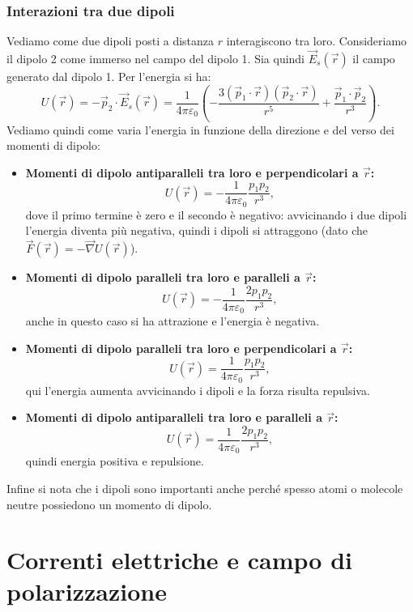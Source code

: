 \documentclass{book}
\begin{document}
\subsection{Interazioni tra due dipoli}
Vediamo come due dipoli posti a distanza $r$ interagiscono tra loro. Consideriamo il dipolo 2 come immerso nel campo del dipolo 1. Sia quindi $\vec{E}_s(\vec{r})$ il campo generato dal dipolo 1. Per l'energia si ha:
\[
U(\vec{r})= - \vec{p}_2\cdot\vec{E}_s(\vec{r})
= \frac{1}{4\pi\varepsilon_0}\!\left(-\frac{3(\vec{p}_1\cdot\vec{r})(\vec{p}_2\cdot\vec{r})}{r^5}+\frac{\vec{p}_1\cdot\vec{p}_2}{r^3}\right).
\]
Vediamo quindi come varia l'energia in funzione della direzione e del verso dei momenti di dipolo:
\begin{itemize}
    \item \textbf{Momenti di dipolo antiparalleli tra loro e perpendicolari a $\vec{r}$:}\\
    \[
    U(\vec{r}) = -\frac{1}{4\pi\varepsilon_0}\frac{p_1p_2}{r^3},
    \]
    dove il primo termine è zero e il secondo è negativo: avvicinando i due dipoli l'energia diventa più negativa, quindi i dipoli si attraggono (dato che $\vec{F}(\vec{r})= -\vec{\nabla}U(\vec{r})$).
    \item \textbf{Momenti di dipolo paralleli tra loro e paralleli a $\vec{r}$:}\\
    \[
    U(\vec{r})= -\frac{1}{4\pi\varepsilon_0}\frac{2p_1p_2}{r^3},
    \]
    anche in questo caso si ha attrazione e l'energia è negativa.
    \item \textbf{Momenti di dipolo paralleli tra loro e perpendicolari a $\vec{r}$:}\\
    \[
    U(\vec{r})= \frac{1}{4\pi\varepsilon_0}\frac{p_1p_2}{r^3},
    \]
    qui l'energia aumenta avvicinando i dipoli e la forza risulta repulsiva.
    \item \textbf{Momenti di dipolo antiparalleli tra loro e paralleli a $\vec{r}$:}\\
    \[
    U(\vec{r})=\frac{1}{4\pi\varepsilon_0}\frac{2p_1p_2}{r^3},
    \]
    quindi energia positiva e repulsione.
\end{itemize}
Infine si nota che i dipoli sono importanti anche perché spesso atomi o molecole neutre possiedono un momento di dipolo.





\chapter{Correnti elettriche e campo di polarizzazione}
\end{document}
